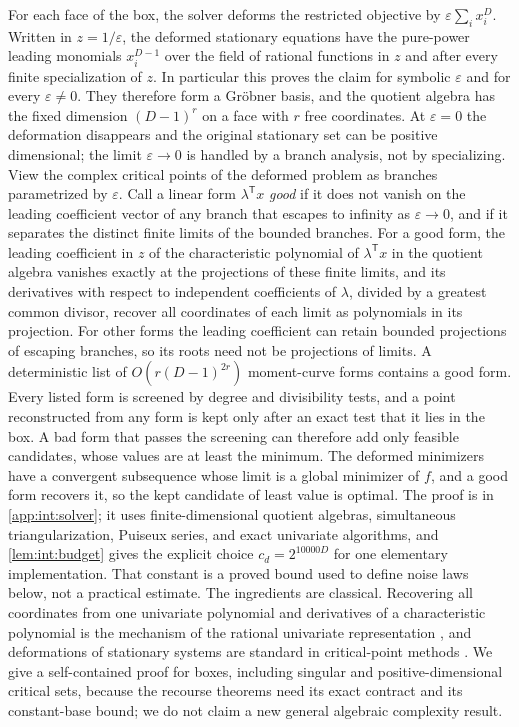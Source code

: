 For each face of the box, the solver deforms the restricted objective by
$\varepsilon\sum_ix_i^D$. Written in $z=1/\varepsilon$, the deformed
stationary equations have the pure-power leading monomials $x_i^{D-1}$ over
the field of rational functions in $z$ and after every finite specialization
of $z$. In particular this proves the claim for symbolic $\varepsilon$ and
for every $\varepsilon\ne0$.
They therefore form a Gr\"obner basis, and the quotient algebra has the
fixed dimension $(D-1)^r$ on a face with $r$ free coordinates. At
$\varepsilon=0$ the deformation disappears and the original stationary set
can be positive dimensional; the limit $\varepsilon\to0$ is handled by a
branch analysis, not by specializing. View the complex critical points of
the deformed problem as branches parametrized by $\varepsilon$. Call a linear
form $\lambda^{\mathsf T}x$ \emph{good} if it does not vanish on the leading
coefficient vector of any branch that escapes to infinity as
$\varepsilon\to0$, and if it separates the distinct finite limits of the
bounded branches. For a good form, the
leading coefficient in $z$ of the characteristic polynomial of
$\lambda^{\mathsf T}x$ in the quotient algebra vanishes exactly at the
projections of these finite limits, and its derivatives with respect to
independent coefficients of $\lambda$, divided by a greatest common divisor,
recover all coordinates of each limit as polynomials in its projection. For
other forms the leading coefficient can retain bounded projections of
escaping branches, so its roots need not be projections of limits. A
deterministic list of $O(r(D-1)^{2r})$ moment-curve forms contains a good
form. Every listed form is screened by degree and divisibility tests, and a
point reconstructed from any form is kept only after an exact test that it
lies in the box. A bad form that passes the screening can therefore add only
feasible candidates, whose values are at least the minimum. The deformed
minimizers have a convergent subsequence whose limit is a global minimizer of
$f$, and a good form recovers it, so the kept candidate of least value is
optimal. The proof is in \cref{app:int:solver}; it uses finite-dimensional
quotient algebras, simultaneous triangularization, Puiseux series, and exact
univariate algorithms, and \cref{lem:int:budget} gives the explicit choice
$c_d=2^{10000D}$ for one elementary implementation. That constant is a proved
bound used to define noise laws below, not a practical estimate. The
ingredients are classical. Recovering all coordinates from one univariate
polynomial and derivatives of a characteristic polynomial is the mechanism of
the rational univariate representation \citep{rouillier1999-solving-zero-dimensional-systems-through},
and deformations of stationary systems are standard in critical-point
methods \citep{basu2006-algorithms-in-real-algebraic-geometry}. We give a self-contained proof for boxes,
including singular and positive-dimensional critical sets, because the
recourse theorems need its exact contract and its constant-base bound; we do
not claim a new general algebraic complexity result.

